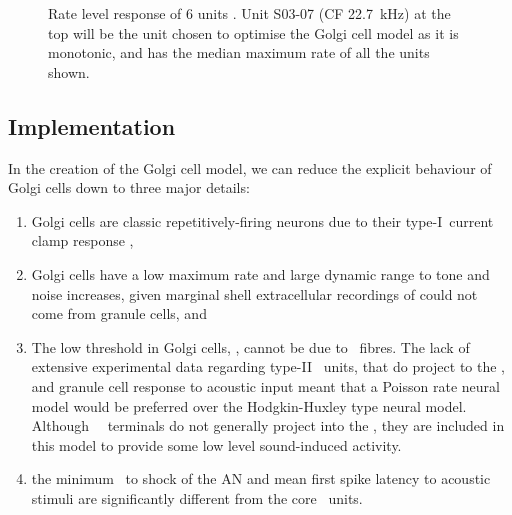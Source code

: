 
 \begin{figure}[htp!]
   \centering
  \caption[Rate level response of marginal shell units]{Rate level response of 6
    units \citep[Reproduced with permission Fig.~2]{GhoshalKim:1997}. Unit
    S03-07 (CF 22.7~kHz) at the top will be the unit chosen to optimise the
    Golgi cell model as it is monotonic, and has the median maximum rate of all
    the units shown. \label{fig:GolgiKimFig2}}
\end{figure}

\subsection{Implementation    \label{sec:Golgi:implementation}}

In the creation of the Golgi cell model, we can reduce the explicit
behaviour of Golgi cells down to three major details:
 \begin{enumerate}
 \item Golgi cells are classic repetitively-firing neurons due to their
   type-I~current clamp response \citep{FerragamoGoldingEtAl:1998},
 \item Golgi cells have a low maximum rate and large dynamic range to tone and
   noise increases, given marginal shell extracellular recordings of
   \citet{GhoshalKim:1997} could not come from granule cells, and
 \item The low threshold in Golgi cells, \citet{GhoshalKim:1997}, can\-not be due
   to \LSR~\AN fibres. The lack of extensive experimental data regarding type-II
   \ANF~units, that do project to the \GCD, and granule cell response to
   acoustic input meant that a Poisson rate neural model would be preferred over
   the Hodgkin-Huxley type neural model.  Although \HSR~\ANF~terminals do not
   generally project into the \GCD, they are included in this model to provide
   some low level sound-induced activity.
 \item the minimum \EPSP~to shock of the AN \citep{FerragamoGoldingEtAl:1998}
   and mean first spike latency to acoustic stimuli \citep{GhoshalKim:1997} are
   significantly different from the core \VCN~units.
 \end{enumerate}


